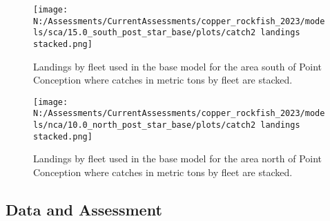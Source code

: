 \documentclass[11pt,
  english,
  letterpaper,
]{article}
\begin{document}
\begin{figure}
\centering
\texttt{[image: N:/Assessments/CurrentAssessments/copper\_rockfish\_2023/models/sca/15.0\_south\_post\_star\_base/plots/catch2 landings stacked.png]}
\caption{Landings by fleet used in the base model for the area south of Point Conception where catches in metric tons by fleet are stacked.\label{fig:es-south-catch}}
\end{figure}

\begin{figure}
\centering
\texttt{[image: N:/Assessments/CurrentAssessments/copper\_rockfish\_2023/models/nca/10.0\_north\_post\_star\_base/plots/catch2 landings stacked.png]}
\caption{Landings by fleet used in the base model for the area north of Point Conception where catches in metric tons by fleet are stacked.\label{fig:es-north-catch}}
\end{figure}

\pagebreak

\hypertarget{data-and-assessment}{%
\subsection*{Data and Assessment}\label{data-and-assessment}}
\end{document}
